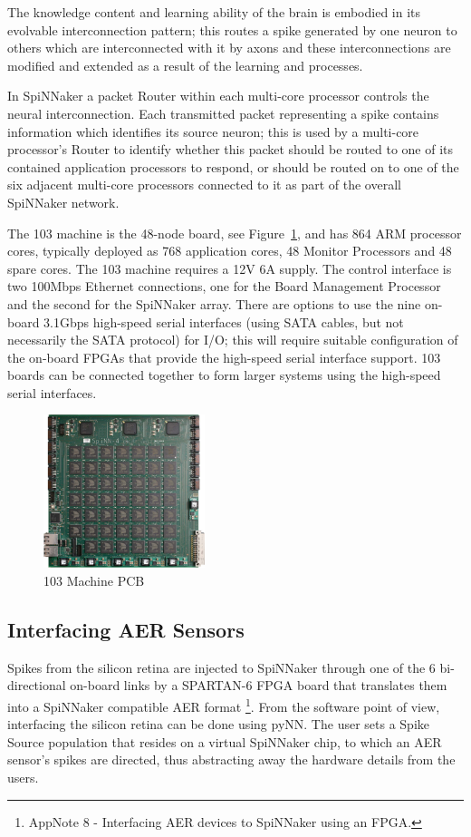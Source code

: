 \documentclass[journal]{journal}
\begin{document}
The knowledge content and learning ability of the brain is embodied in its evolvable interconnection pattern; 
this routes a spike generated by one neuron to others which are interconnected with it by axons and these interconnections are modified and extended as a result of the learning and processes.

In SpiNNaker a packet Router within each multi-core processor controls the neural interconnection. 
Each transmitted packet representing a spike contains information which identifies its source neuron; 
this is used by a multi-core processor's Router to identify whether this packet should be routed to one of its contained application processors to respond, or should be routed on to one of the six adjacent multi-core processors connected to it as part of the overall SpiNNaker network.

The 103 machine is the 48-node board, see Figure~\ref{fig:48node}, and has 864 ARM processor cores, typically deployed as 768 application cores, 48 Monitor Processors and 48 spare cores. The 103 machine requires a 12V 6A supply. 
The control interface is two 100Mbps Ethernet connections, one for the Board Management Processor and the second for the SpiNNaker array. 
There are options to use the nine on-board 3.1Gbps high-speed serial interfaces (using SATA cables, but not necessarily the SATA protocol) for I/O; 
this will require suitable configuration of the on-board FPGAs that provide the high-speed serial interface support. 
103 boards can be connected together to form larger systems using the high-speed serial interfaces. 

\begin{figure}
\centering
	\includegraphics[width=0.42\textwidth]{pics/48node_pcb_resolution-white.pdf}
	\caption{103 Machine PCB}
	\label{fig:48node}
\end{figure}

\subsection{Interfacing AER Sensors}
Spikes from the silicon retina are injected to SpiNNaker through one of the 6 bi-directional on-board links by a SPARTAN-6 FPGA board that translates them into a SpiNNaker compatible AER format \footnote{AppNote 8 - Interfacing AER devices to SpiNNaker using an FPGA.}. 
From the software point of view, interfacing the silicon retina can be done using pyNN. 
The user sets a Spike Source population that resides on a virtual SpiNNaker chip, to which an AER sensor's spikes are directed, thus abstracting away the hardware details from the users\cite{galluppi2012real}.
\end{document}

